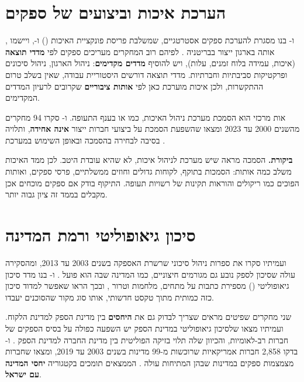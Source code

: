 \section{הערכת איכות וביצועים של ספקים}\label{sec:lit-quality}

,  ו- בנו מסגרת להערכת ספקים אסטרטגיים, שמשלבת פריסת פונקציית האיכות () ו-, ויישמו אותה בארגון ייצור בבריטניה \cite{dey2015}. לפיהם רוב המחקרים מעריכים ספקים לפי \textbf{מדדי תוצאה} (איכות, עמידה בלוח זמנים, עלות), ויש להוסיף \textbf{מדדים מקדימים}: ניהול הארגון, ניהול סיכונים ופרקטיקות סביבתיות וחברתיות. מדדי תוצאה דורשים היסטוריית עבודה, שאין בשלב טרום ההתקשרות, ולכן איכות מוערכת כאן לפי \textbf{אותות ציבוריים} שקרובים לרעיון המדדים המקדימים.

אות מרכזי הוא הסמכת מערכת ניהול האיכות, כמו  או  בענף התעופה.  ו- סקרו 94 מחקרים מהשנים 2000 עד 2023 ומצאו שהשפעת הסמכת  על ביצועי חברות ייצור \textbf{אינה אחידה}, ותלויה בסיבה לבחירה בהסמכה ובאופן השימוש במערכת \cite{ayyadi2024}.

\textbf{ביקורת.} הסמכה מראה שיש מערכת לניהול איכות, לא שהיא עובדת היטב. לכן ממד האיכות משלב כמה אותות: הסמכות בתוקף, לקוחות גדולים וחוזים ממשלתיים, פרסי ספקים, ואותות הפוכים כמו ריקולים והוראות תקינות של רשויות תעופה. התיקוף בודק אם ספקים מוכחים אכן מקבלים בממד זה ציון גבוה יותר.

\section{סיכון גיאופוליטי ורמת המדינה}\label{sec:lit-geo}

 ועמיתיו סקרו את ספרות ניהול סיכוני שרשרת האספקה בשנים 2003 עד 2013, ומהסקירה עולה שסיכון לספק נובע גם מגורמים חיצוניים, כמו המדינה שבה הוא פועל \cite{ho2015}.  ו- בנו מדד סיכון גיאופוליטי () מספירת כתבות על מתחים, מלחמות וטרור \cite{caldara2022}, ובכך הראו שאפשר למדוד סיכון כזה כמותית מתוך טקסט חדשותי, אותו סוג מקור שהסוכנים יעבדו.

שני מחקרים שפיטים מראים שצריך לבדוק גם את \textbf{היחסים} בין מדינת הספק למדינת הלקוח.  ועמיתיו מצאו שלסיכון גיאופוליטי במדינת הספק יש השפעה כפולה על בסיס הספקים של חברות רב-לאומיות, והכיוון שלה תלוי בזיקה הפוליטית בין מדינת החברה למדינת הספק \cite{bai2025}.  ו- בדקו 2,858 חברות אמריקאיות שרוכשות מ-99 מדינות בשנים 2003 עד 2019, ומצאו שחברות מצמצמות ספקים במדינות שבהן המתיחות עולה \cite{charpin2025}. הממצאים תומכים בקטגוריה \textbf{יחסי המדינה עם ישראל}.

